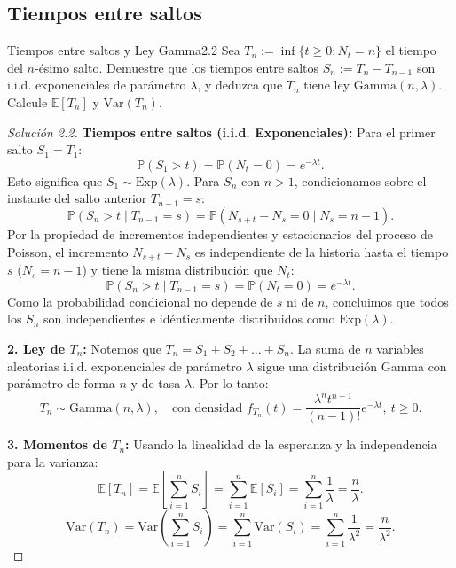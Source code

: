 \documentclass[10pt,a4paper]{article}
\begin{document}
\newpage
\subsection{Tiempos entre saltos}

\begin{ejercicio}{Tiempos entre saltos y Ley Gamma}{2.2}
    Sea $T_n := \inf\{t \ge 0 : N_t = n\}$ el tiempo del $n$-ésimo salto. Demuestre que los tiempos entre saltos $S_n := T_n - T_{n-1}$ son i.i.d. exponenciales de parámetro $\lambda$, y deduzca que $T_n$ tiene ley $\text{Gamma}(n, \lambda)$. Calcule $\mathbb{E}[T_n]$ y $\text{Var}(T_n)$.
\end{ejercicio}

\begin{proof}[Solución 2.2]
    \textbf{Tiempos entre saltos (i.i.d. Exponenciales):}
    Para el primer salto $S_1 = T_1$:
    \[ \mathbb{P}(S_1 > t) = \mathbb{P}(N_t = 0) = e^{-\lambda t}. \]
    Esto significa que $S_1 \sim \text{Exp}(\lambda)$.
    Para $S_n$ con $n > 1$, condicionamos sobre el instante del salto anterior $T_{n-1} = s$:
    \[ \mathbb{P}(S_n > t \mid T_{n-1} = s) = \mathbb{P}(N_{s+t} - N_s = 0 \mid N_s = n-1). \]
    Por la propiedad de incrementos independientes y estacionarios del proceso de Poisson, el incremento $N_{s+t} - N_s$ es independiente de la historia hasta el tiempo $s$ ($N_s = n-1$) y tiene la misma distribución que $N_t$:
    \[ \mathbb{P}(S_n > t \mid T_{n-1} = s) = \mathbb{P}(N_t = 0) = e^{-\lambda t}. \]
    Como la probabilidad condicional no depende de $s$ ni de $n$, concluimos que todos los $S_n$ son independientes e idénticamente distribuidos como $\text{Exp}(\lambda)$.

    \textbf{2. Ley de $T_n$:}
    Notemos que $T_n = S_1 + S_2 + \dots + S_n$. La suma de $n$ variables aleatorias i.i.d. exponenciales de parámetro $\lambda$ sigue una distribución Gamma con parámetro de forma $n$ y de tasa $\lambda$. Por lo tanto:
    \[ T_n \sim \text{Gamma}(n, \lambda), \quad \text{con densidad } f_{T_n}(t) = \frac{\lambda^n t^{n-1}}{(n-1)!}e^{-\lambda t}, \ t \ge 0. \]

    \textbf{3. Momentos de $T_n$:}
    Usando la linealidad de la esperanza y la independencia para la varianza:
    \[ \mathbb{E}[T_n] = \mathbb{E}\left[ \sum_{i=1}^n S_i \right] = \sum_{i=1}^n \mathbb{E}[S_i] = \sum_{i=1}^n \frac{1}{\lambda} = \frac{n}{\lambda}. \]
    \[ \text{Var}(T_n) = \text{Var}\left( \sum_{i=1}^n S_i \right) = \sum_{i=1}^n \text{Var}(S_i) = \sum_{i=1}^n \frac{1}{\lambda^2} = \frac{n}{\lambda^2}. \]
\end{proof}
\end{document}
